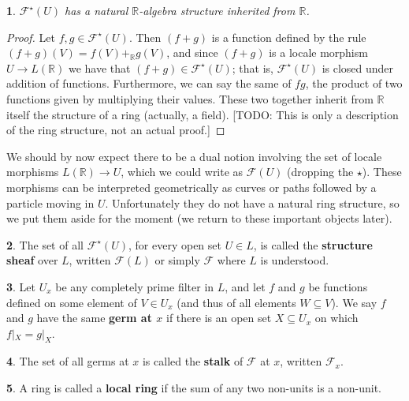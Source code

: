\documentclass[oneside,english]{amsbook}
\numberwithin{section}{chapter}
\theoremstyle{plain}
\newtheorem{thm}{\protect\theoremname}
\theoremstyle{definition}
\newtheorem{defn}[thm]{\protect\definitionname}
\providecommand{\definitionname}{Definition}
\providecommand{\theoremname}{Theorem}
\begin{document}
\begin{thm}
	$\mathscr{F}^\star(U)$ has a natural $\mathbb{R}$-algebra structure inherited from $\mathbb{R}$.
\end{thm}

\begin{proof}
	Let $f, g\in \mathscr{F}^\star(U)$. Then $(f + g)$ is a function defined by the rule $(f + g)(V) = f(V) +_\mathbb{R} g(V)$, and since $(f + g)$ is a locale morphism $U\to L(\mathbb{R})$ we have that $(f + g)\in \mathscr{F}^\star(U)$; that is, $ \mathscr{F}^\star(U)$ is closed under addition of functions. Furthermore, we can say the same of $fg$, the product of two functions given by multiplying their values. These two together inherit from $\mathbb{R}$ itself the structure of a ring (actually, a field).
	[TODO: This is only a description of the ring structure, not an actual proof.]
\end{proof}

We should by now expect there to be a dual notion involving the set of locale morphisms $L(\mathbb{R})\to U$, which we could write as $\mathscr{F}(U)$ (dropping the $\star$). These morphisms can be interpreted geometrically as curves or paths followed by a particle moving in $U$. Unfortunately they do not have a natural ring structure, so we put them aside for the moment (we return to these important objects later).

\begin{defn}
	The set of all $\mathscr{F}^\star(U)$, for every open set $U\in L$, is called the \textbf{structure sheaf} over $L$, written $\mathscr{F}(L)$ or simply $\mathscr{F}$ where $L$ is understood.
\end{defn}

\begin{defn}
	Let $U_x$ be any completely prime filter in $L$, and let $f$ and $g$ be functions defined on some element of $V\in U_x$ (and thus of all elements $W\subseteq V$). We say $f$ and $g$ have the same \textbf{germ at $x$} if there is an open set $X\subseteq U_x$ on which $f|_X=g|_X$. 
\end{defn}

\begin{defn}
	The set of all germs at $x$ is called the \textbf{stalk} of $\mathscr{F}$ at $x$, written $\mathscr{F}_x$.
\end{defn}

\begin{defn}
	A ring is called a \textbf{local ring} if the sum of any two non-units is a non-unit.
\end{defn}
\end{document}
